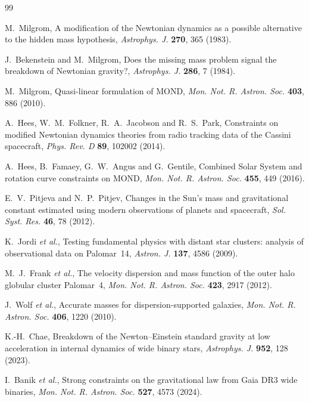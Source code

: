 \documentclass[twocolumn]{iopjournal}
\theoremstyle{definition}
\theoremstyle{remark}
\begin{document}
\begin{thebibliography}{99}

M.~Milgrom, A modification of the Newtonian dynamics as a possible
alternative to the hidden mass hypothesis, \textit{Astrophys. J.}
\textbf{270}, 365 (1983).

J.~Bekenstein and M.~Milgrom, Does the missing mass problem signal the
breakdown of Newtonian gravity?, \textit{Astrophys. J.} \textbf{286}, 7
(1984).

M.~Milgrom, Quasi-linear formulation of MOND, \textit{Mon. Not. R.
Astron. Soc.} \textbf{403}, 886 (2010).

A.~Hees, W.~M.~Folkner, R.~A.~Jacobson and R.~S.~Park, Constraints on
modified Newtonian dynamics theories from radio tracking data of the
Cassini spacecraft, \textit{Phys. Rev. D} \textbf{89}, 102002 (2014).

A.~Hees, B.~Famaey, G.~W.~Angus and G.~Gentile, Combined Solar System
and rotation curve constraints on MOND, \textit{Mon. Not. R. Astron.
Soc.} \textbf{455}, 449 (2016).

E.~V.~Pitjeva and N.~P.~Pitjev, Changes in the Sun's mass and gravitational
constant estimated using modern observations of planets and spacecraft,
\textit{Sol. Syst. Res.} \textbf{46}, 78 (2012).

K.~Jordi \textit{et al.}, Testing fundamental physics with distant star
clusters: analysis of observational data on Palomar~14,
\textit{Astron. J.} \textbf{137}, 4586 (2009).

M.~J.~Frank \textit{et al.}, The velocity dispersion and mass function of
the outer halo globular cluster Palomar~4, \textit{Mon. Not. R. Astron.
Soc.} \textbf{423}, 2917 (2012).

J.~Wolf \textit{et al.}, Accurate masses for dispersion-supported
galaxies, \textit{Mon. Not. R. Astron. Soc.} \textbf{406}, 1220 (2010).

K.-H.~Chae, Breakdown of the Newton--Einstein standard gravity at low
acceleration in internal dynamics of wide binary stars,
\textit{Astrophys. J.} \textbf{952}, 128 (2023).

I.~Banik \textit{et al.}, Strong constraints on the gravitational law
from Gaia DR3 wide binaries, \textit{Mon. Not. R. Astron. Soc.}
\textbf{527}, 4573 (2024).


\end{thebibliography}
\end{document}
